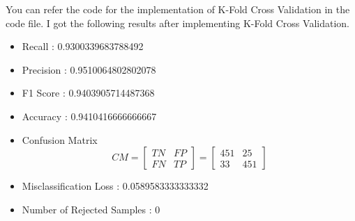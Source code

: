 \documentclass{article}
\begin{document}
\begin{itemize}
    You can refer the code for the implementation of K-Fold Cross Validation in the code file. I got the following results after implementing K-Fold Cross Validation.
    \begin{itemize}
        \item Recall : 0.9300339683788492
        \item Precision : 0.9510064802802078
        \item F1 Score : 0.9403905714487368
        \item Accuracy : 0.9410416666666667
        \item Confusion Matrix
        \[CM = \begin{bmatrix}
            TN & FP \\
            FN & TP
        \end{bmatrix} = \begin{bmatrix}
            451 & 25 \\
            33 & 451
        \end{bmatrix}\]
        \item Misclassification Loss : 0.0589583333333332
        \item Number of Rejected Samples : 0
    \end{itemize}

\end{itemize}



\end{document}
